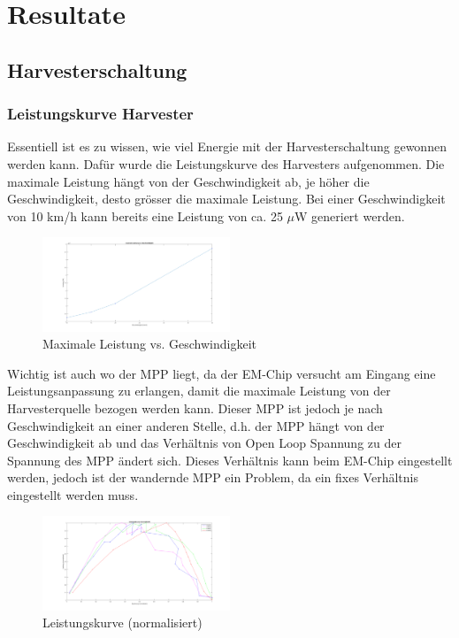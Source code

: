 \chapter{Resultate}
\label{ch_resultat}

\section{Harvesterschaltung}

\subsection{Leistungskurve Harvester}

Essentiell ist es zu wissen, wie viel Energie mit der Harvesterschaltung gewonnen werden kann. Dafür wurde die Leistungskurve des Harvesters aufgenommen. Die maximale Leistung hängt von der Geschwindigkeit ab, je höher die Geschwindigkeit, desto grösser die maximale Leistung. Bei einer Geschwindigkeit von 10 km/h kann bereits eine Leistung von ca. 25 $\mu$W generiert werden. 

\begin{figure}[ht]
\includegraphics[width=0.5\textwidth]{4Resultate/imag/ResultatLeistungGeschwindigkeit.png} 
\caption{Maximale Leistung vs. Geschwindigkeit}
\label{mpp_resultat_harvester}
\end{figure}

Wichtig ist auch wo der MPP liegt, da der EM-Chip versucht am Eingang eine Leistungsanpassung zu erlangen, damit die maximale Leistung von der Harvesterquelle bezogen werden kann. Dieser MPP ist jedoch je nach Geschwindigkeit an einer anderen Stelle, d.h. der MPP hängt von der Geschwindigkeit ab und das Verhältnis von Open Loop Spannung zu der Spannung des MPP ändert sich. Dieses Verhältnis kann beim EM-Chip eingestellt werden, jedoch ist der wandernde MPP ein Problem, da ein fixes Verhältnis eingestellt werden muss.

\begin{figure}[ht]
\includegraphics[width=0.5\textwidth]{4Resultate/imag/MPPHarvester.png} 
\caption{Leistungskurve (normalisiert) }
\end{figure}


